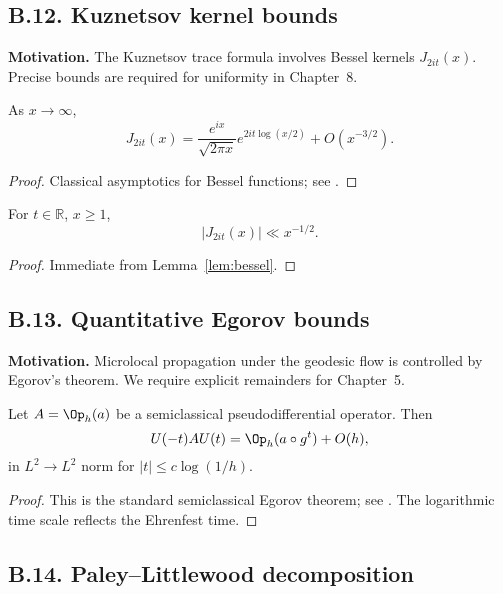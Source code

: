 \subsection*{B.12. Kuznetsov kernel bounds}

\noindent
\textbf{Motivation.}
The Kuznetsov trace formula involves Bessel kernels $J_{2it}(x)$. Precise
bounds are required for uniformity in Chapter~8.

\begin{lemma}\label{lem:bessel}
As $x\to\infty$,
\[
J_{2it}(x) = \frac{e^{ix}}{\sqrt{2\pi x}} e^{2it\log(x/2)} + O(x^{-3/2}).
\]
\end{lemma}

\begin{proof}
Classical asymptotics for Bessel functions; see \cite[§8.451]{GradshteynRyzhik}.
\end{proof}

\begin{corollary}\label{cor:kuznetsov-kernel}
For $t\in\mathbb R$, $x\ge 1$,
\[
|J_{2it}(x)| \ll x^{-1/2}.
\]
\end{corollary}

\begin{proof}
Immediate from Lemma~\ref{lem:bessel}.
\end{proof}

\subsection*{B.13. Quantitative Egorov bounds}

\noindent
\textbf{Motivation.}
Microlocal propagation under the geodesic flow is controlled by Egorov’s theorem.
We require explicit remainders for Chapter~5.

\begin{lemma}\label{lem:egorov}
Let $A=\Op_h(a)$ be a semiclassical pseudodifferential operator. Then
\[
U(-t) A U(t) = \Op_h(a\circ g^t) + O(h),
\]
in $L^2\to L^2$ norm for $|t|\le c\log(1/h)$.
\end{lemma}

\begin{proof}
This is the standard semiclassical Egorov theorem; see \cite{Zworski2012}.
The logarithmic time scale reflects the Ehrenfest time.
\end{proof}

\subsection*{B.14. Paley–Littlewood decomposition}

